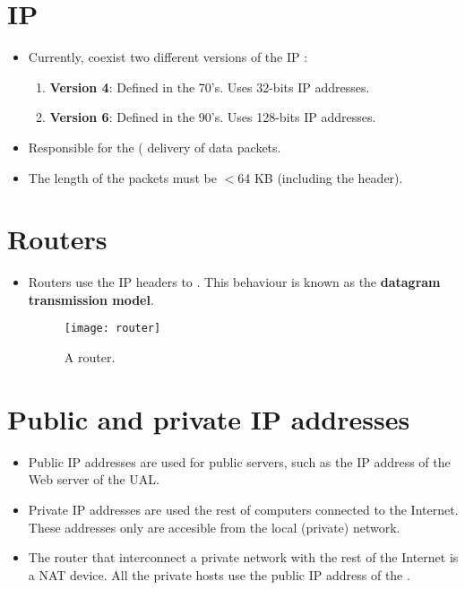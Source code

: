 \section{\gls{IP}}
\begin{itemize}
\item Currently, coexist two different versions of the IP
  \cite{wikipedia_IP}:
  \begin{enumerate}
  \item \textbf{Version 4}: Defined in the 70's. Uses 32-bits IP addresses.
  \item \textbf{Version 6}: Defined in the 90's. Uses 128-bits IP addresses.
  \end{enumerate}
\item Responsible for the ( delivery of data packets.
\item The length of the packets must be $<6$4 KB (including the header).
\end{itemize}

\section{Routers}
\begin{itemize} 
\item Routers use the IP headers to . This behaviour is known as the \textbf{datagram
    transmission model}.
\begin{figure}[H]
  \vspace{1ex}
  \centering
  \texttt{[image: router]}
  \caption{A router.}
  \label{fig:router}
\end{figure}
\end{itemize}

\section{Public and private IP addresses}
\begin{itemize}
\item Public IP addresses are used for public servers, such as the IP
  address of the Web server of the UAL.
\item Private IP addresses are used the rest of computers connected to
  the Internet. These addresses only are accesible from the local
  (private) network.
\item The router that interconnect a private network with the rest of
  the Internet is a \gls{NAT} device. All the private hosts use the
  public IP address of the .
\end{itemize}

